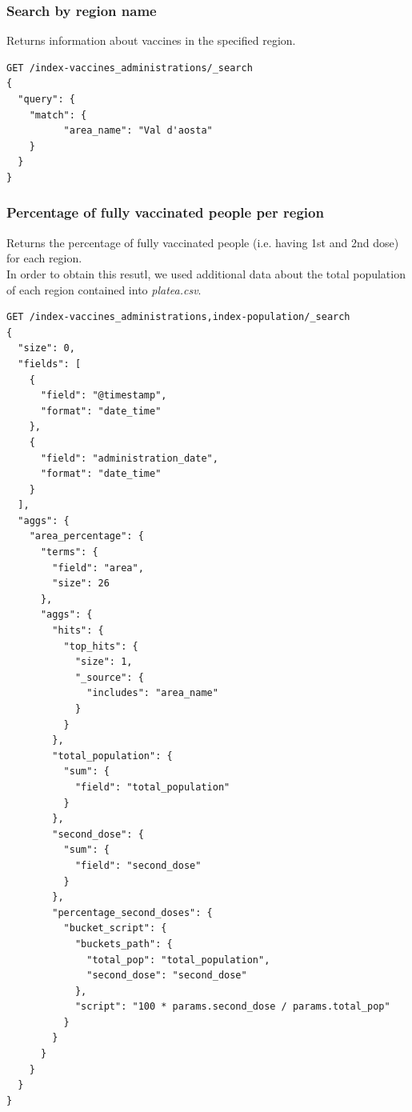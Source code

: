\documentclass[12pt, a4paper]{article}
\begin{document}
\subsubsection{Search by region name}
Returns information about vaccines in the specified region.
\begin{tcolorbox}[fontupper=\scriptsize]
  \begin{verbatim}
GET /index-vaccines_administrations/_search
{
  "query": {
    "match": {
          "area_name": "Val d'aosta"
    }
  }
}
  \end{verbatim}
\end{tcolorbox}

\subsubsection{Percentage of fully vaccinated people per region}
Returns the percentage of fully vaccinated people (i.e. having 1st and 2nd dose) 
for each region. \\
In order to obtain this resutl, we used additional data about the total population of 
each region contained into \emph{platea.csv}.
\begin{tcolorbox}[fontupper=\scriptsize]
  \begin{verbatim}
GET /index-vaccines_administrations,index-population/_search 
{
  "size": 0,
  "fields": [
    {
      "field": "@timestamp",
      "format": "date_time"
    },
    {
      "field": "administration_date",
      "format": "date_time"
    }
  ],
  "aggs": {
    "area_percentage": {
      "terms": {
        "field": "area",
        "size": 26
      },
      "aggs": {
        "hits": {
          "top_hits": {
            "size": 1,
            "_source": {
              "includes": "area_name"
            }
          }
        },
        "total_population": {
          "sum": {
            "field": "total_population"
          }
        },
        "second_dose": {
          "sum": {
            "field": "second_dose"
          }
        },
        "percentage_second_doses": {
          "bucket_script": {
            "buckets_path": {
              "total_pop": "total_population",
              "second_dose": "second_dose"
            },
            "script": "100 * params.second_dose / params.total_pop"
          }
        }
      }
    }
  }
}
  \end{verbatim}
\end{tcolorbox}
\end{document}
